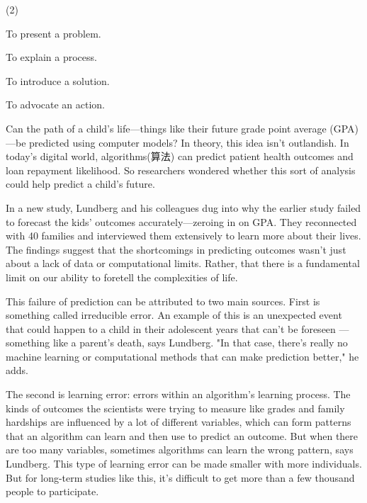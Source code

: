 \documentclass{英语试卷}
\begin{document}
\begin{choices}(2)
  \item To present a problem.
  \item To explain a process.
  \item To introduce a solution.
  \item To advocate an action.
\end{choices}
\par Can the path of a child's life—things like their future grade point average (GPA)—be predicted using computer models? In theory, this idea isn't outlandish. In today's digital world, algorithms(算法) can predict patient health outcomes and loan repayment likelihood. So researchers wondered whether this sort of analysis could help predict a child's future.\par
\par In a new study, Lundberg and his colleagues dug into why the earlier study failed to forecast the kids' outcomes accurately—zeroing in on GPA. They reconnected with 40 families and interviewed them extensively to learn more about their lives. The findings suggest that the shortcomings in predicting outcomes wasn't just about a lack of data or computational limits. Rather, that there is a fundamental limit on our ability to foretell the complexities of life.\par
\par This failure of prediction can be attributed to two main sources. First is something called irreducible error. An example of this is an unexpected event that could happen to a child in their adolescent years that can't be foreseen —something like a parent's death, says Lundberg. "In that case, there's really no machine learning or computational methods that can make prediction better," he adds.\par
\par The second is learning error: errors within an algorithm's learning process. The kinds of outcomes the scientists were trying to measure like grades and family hardships are influenced by a lot of different variables, which can form patterns that an algorithm can learn and then use to predict an outcome. But when there are too many variables, sometimes algorithms can learn the wrong pattern, says Lundberg. This type of learning error can be made smaller with more individuals. But for long-term studies like this, it's difficult to get more than a few thousand people to participate.\par
\end{document}
